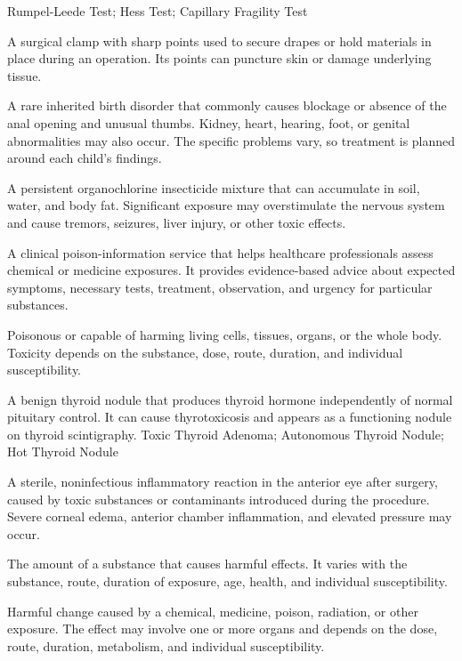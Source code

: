 \synonyms
Rumpel-Leede Test; Hess Test; Capillary Fragility Test

 A surgical clamp with sharp points used to secure drapes or hold materials in place during an operation. Its points can puncture skin or damage underlying tissue.

 A rare inherited birth disorder that commonly causes blockage or absence of the anal opening and unusual thumbs. Kidney, heart, hearing, foot, or genital abnormalities may also occur. The specific problems vary, so treatment is planned around each child’s findings.

 A persistent organochlorine insecticide mixture that can accumulate in soil, water, and body fat. Significant exposure may overstimulate the nervous system and cause tremors, seizures, liver injury, or other toxic effects.

 A clinical poison-information service that helps healthcare professionals assess chemical or medicine exposures. It provides evidence-based advice about expected symptoms, necessary tests, treatment, observation, and urgency for particular substances.

 Poisonous or capable of harming living cells, tissues, organs, or the whole body. Toxicity depends on the substance, dose, route, duration, and individual susceptibility.

 A benign thyroid nodule that produces thyroid hormone independently of normal pituitary control. It can cause thyrotoxicosis and appears as a functioning nodule on thyroid scintigraphy.
\synonyms
Toxic Thyroid Adenoma; Autonomous Thyroid Nodule; Hot Thyroid Nodule

 A sterile, noninfectious inflammatory reaction in the anterior eye after surgery, caused by toxic substances or contaminants introduced during the procedure. Severe corneal edema, anterior chamber inflammation, and elevated pressure may occur.

 The amount of a substance that causes harmful effects. It varies with the substance, route, duration of exposure, age, health, and individual susceptibility.

 Harmful change caused by a chemical, medicine, poison, radiation, or other exposure. The effect may involve one or more organs and depends on the dose, route, duration, metabolism, and individual susceptibility.

